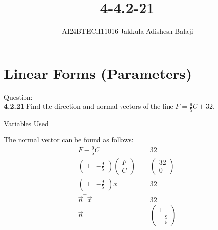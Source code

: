 \documentclass[journal]{IEEEtran}
\begin{document}

\renewcommand{\thefigure}{\theenumi}
\renewcommand{\thetable}{\theenumi}
\setlength{\intextsep}{10pt} %
\title{4-4.2-21}
\author{AI24BTECH11016-Jakkula Adishesh Balaji}
\maketitle

\section*{\textbf{Linear Forms (Parameters)}}
\parindent 0pt
Question: \\
\textbf{4.2.21} Find the direction and normal vectors of the line \( F = \frac{9}{5}C + 32 \).

\begin{table}[h!]    	
    \centering
    
    \caption{Variables Used}
    \label{tab1-1.9-6}
\end{table}

\solution
The normal vector can be found as follows:
\begin{align}
    F - \frac{9}{5}C &= 32 \\
    \begin{pmatrix} 1 & -\frac{9}{5} \end{pmatrix} \begin{pmatrix} F \\ C \end{pmatrix} &= \begin{pmatrix} 32 \\ 0 \end{pmatrix} \\
    \begin{pmatrix} 1 & -\frac{9}{5} \end{pmatrix} x &= 32 \\
    \vec{n}^\top \vec{x} &= 32\\
    \vec{n} &= \begin{pmatrix} 1 \\ -\frac{9}{5} \end{pmatrix}
\end{align}
\end{document}
